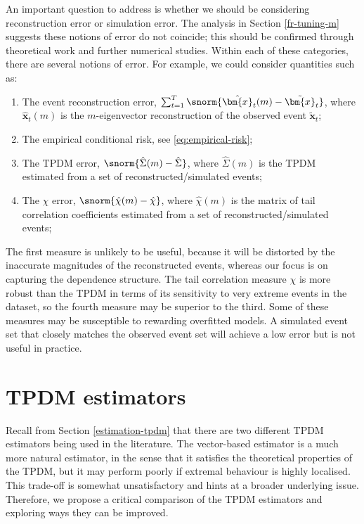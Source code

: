 \documentclass[en-GB, a4paper, nobind]{templates/bathreport}
\begin{document}
An important question to address is whether we should be considering reconstruction error or simulation error. The analysis in Section \ref{fr-tuning-m} suggests these notions of error do not coincide; this should be confirmed through theoretical work and further numerical studies. Within each of these categories, there are several notions of error. For example, we could consider quantities such as:

\begin{enumerate}
\def\labelenumi{\arabic{enumi}.}
\tightlist
\item
  The event reconstruction error, \(\sum_{t=1}^T \snorm{\hat{\bm{x}}_t(m)-\tilde{\bm{x}}_t}\), where \(\hat{\bm{x}}_t(m)\) is the \(m\)-eigenvector reconstruction of the observed event \(\tilde{\bm{x}}_t\);
\item
  The empirical conditional risk, see \eqref{eq:empirical-risk};
\item
  The TPDM error, \(\snorm{\hat{\Sigma}(m)-\hat{\Sigma}}\), where \(\hat{\Sigma}(m)\) is the TPDM estimated from a set of reconstructed/simulated events;
\item
  The \(\chi\) error, \(\snorm{\hat{\chi}(m)-\hat{\chi}}\), where \(\hat{\chi}(m)\) is the matrix of tail correlation coefficients estimated from a set of reconstructed/simulated events;
\end{enumerate}

The first measure is unlikely to be useful, because it will be distorted by the inaccurate magnitudes of the reconstructed events, whereas our focus is on capturing the dependence structure. The tail correlation measure \(\chi\) is more robust than the TPDM in terms of its sensitivity to very extreme events in the dataset, so the fourth measure may be superior to the third. Some of these measures may be susceptible to rewarding overfitted models. A simulated event set that closely matches the observed event set will achieve a low error but is not useful in practice.

\hypertarget{tpdm-estimators}{%
\section{TPDM estimators}\label{tpdm-estimators}}

Recall from Section \ref{estimation-tpdm} that there are two different TPDM estimators being used in the literature. The vector-based estimator is a much more natural estimator, in the sense that it satisfies the theoretical properties of the TPDM, but it may perform poorly if extremal behaviour is highly localised. This trade-off is somewhat unsatisfactory and hints at a broader underlying issue. Therefore, we propose a critical comparison of the TPDM estimators and exploring ways they can be improved.
\end{document}
